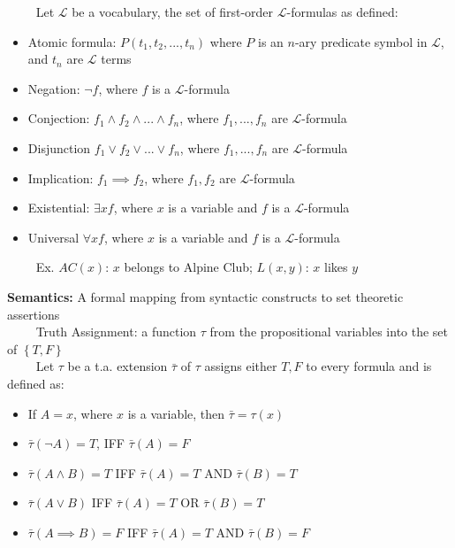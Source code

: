 \documentclass[7pt,landscape]{article}
\begin{document}
\begin{multicols}{2}

$\quad \quad$ Let $\mathcal{L}$ be a vocabulary, the set of first-order $\mathcal{L}$-formulas as defined:

\begin{itemize}
    \item Atomic formula: $P(t_1, t_2, ..., t_n)$ where $P$ is an $n$-ary predicate symbol in $\mathcal{L}$, and $t_n$ are $\mathcal{L}$ terms
    \item Negation: $\neg f$, where $f$ is a $\mathcal{L}$-formula
    \item Conjection: $f_1 \land f_2 \land ... \land f_n$, where $f_1, ..., f_n$ are $\mathcal{L}$-formula
    \item Disjunction $f_1 \lor f_2 \lor ... \lor f_n$, where $f_1, ..., f_n$ are $\mathcal{L}$-formula
    \item Implication: $f_1 \implies f_2$, where $f_1, f_2$ are $\mathcal{L}$-formula
    \item Existential: $\exists x f$, where $x$ is a variable and $f$ is a $\mathcal{L}$-formula
    \item Universal $\forall x f$, where $x$ is a variable and $f$ is a $\mathcal{L}$-formula
\end{itemize}

$\quad\quad$ Ex. $AC(x)$: $x$ belongs to Alpine Club; $L(x, y)$: $x$ likes $y$



\textbf{Semantics:} A formal mapping from syntactic constructs to set theoretic assertions \\
$\quad\quad$ Truth Assignment: a function $\tau$ from the propositional variables into the set of $\left\{ T, F  \right\}$ \\
$\quad\quad$ Let $\tau$ be a t.a. extension $\bar{\tau}$ of $\tau$ assigns either $T, F$ to every formula and is defined as:

\begin{itemize}
    \item If $A = x$, where $x$ is a variable, then $\bar{\tau} = \tau (x)$
    \item $\bar{\tau} (\neg A) = T$, IFF $\bar{\tau} (A) = F$
    \item $\bar{\tau} (A \land B) = T$ IFF $\bar{\tau} (A) = T$ AND $\bar{\tau} (B) = T$
    \item $\bar{\tau} (A \lor B)$ IFF $\bar{\tau} (A) = T$ OR $\bar{\tau} (B) = T$
    \item $\bar{\tau} (A \implies B) = F$ IFF $\bar{\tau} (A) = T$ AND $\bar{\tau} (B) = F$
\end{itemize}


\end{multicols}
\end{document}
